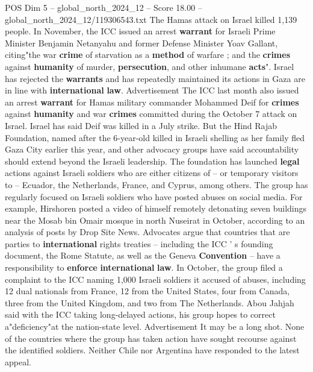 \begin{textsample}{POS Dim 5 – global\_north\_2024\_12 – Score 18.00 – global\_north\_2024\_12/119306543.txt}
The Hamas attack on Israel killed 1,139 people.
In November, the ICC issued an arrest \textbf{warrant} for Israeli Prime Minister Benjamin Netanyahu and former Defense Minister Yoav Gallant, citing"the war \textbf{crime} of starvation as a \textbf{method} of warfare ; and the \textbf{crimes} against \textbf{humanity} of murder, \textbf{persecution}, and other inhumane \textbf{acts}".
Israel has rejected the \textbf{warrants} and has repeatedly maintained its actions in Gaza are in line with \textbf{international} \textbf{law}.
Advertisement The ICC last month also issued an arrest \textbf{warrant} for Hamas military commander Mohammed Deif for \textbf{crimes} against \textbf{humanity} and war \textbf{crimes} committed during the October 7 attack on Israel.
Israel has said Deif was killed in a July strike.
But the Hind Rajab Foundation, named after the 6-year-old killed in Israeli shelling as her family fled Gaza City earlier this year, and other advocacy groups have said accountability should extend beyond the Israeli leadership.
The foundation has launched \textbf{legal} actions against Israeli soldiers who are either citizens of -- or temporary visitors to -- Ecuador, the Netherlands, France, and Cyprus, among others.
The group has regularly focused on Israeli soldiers who have posted abuses on social media.
For example, Hirshoren posted a video of himself remotely detonating seven buildings near the Mosab bin Omair mosque in north Nuseirat in October, according to an analysis of posts by Drop Site News.
Advocates argue that countries that are parties to \textbf{international} rights treaties -- including the ICC ' s founding document, the Rome Statute, as well as the Geneva \textbf{Convention} -- have a responsibility to \textbf{enforce} \textbf{international} \textbf{law}.
In October, the group filed a complaint to the ICC naming 1,000 Israeli soldiers it accused of abuses, including 12 dual nationals from France, 12 from the United States, four from Canada, three from the United Kingdom, and two from The Netherlands.
Abou Jahjah said with the ICC taking long-delayed actions, his group hopes to correct a"deficiency"at the nation-state level.
Advertisement It may be a long shot.
None of the countries where the group has taken action have sought recourse against the identified soldiers.
Neither Chile nor Argentina have responded to the latest appeal.

\end{textsample}
